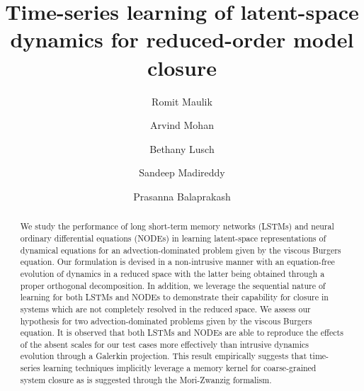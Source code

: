 \documentclass[preprint,12pt]{elsarticle}
\begin{document}
\begin{frontmatter}


\title{Time-series learning of latent-space dynamics for reduced-order model closure}

\author[label1]{Romit Maulik}
\author[label2]{Arvind Mohan}
\author[label1]{Bethany Lusch}
\author[label3]{Sandeep Madireddy}
\author[label1,label3]{Prasanna Balaprakash}

\address[label1]{Argonne Leadership Computing Facility, Argonne National Laboratory, Lemont, IL 60439, USA}
\address[label2]{Center for Nonlinear Studies/CCS-2 Division, Los Alamos National Laboratory, Los Alamos, NM 87545, USA}
\address[label3]{Mathematics and Computer Science Division, Argonne National Laboratory, Lemont, IL 60439, USA}




\begin{abstract}
We study the performance of long short-term memory networks (LSTMs) and neural ordinary differential equations (NODEs) in learning latent-space representations of dynamical equations for an advection-dominated problem given by the viscous Burgers equation. Our formulation is devised in a non-intrusive manner with an equation-free evolution of dynamics in a reduced space with the latter being obtained through a proper orthogonal decomposition. In addition, we leverage the sequential nature of learning for both LSTMs and NODEs to demonstrate their capability for closure in systems which are not completely resolved in the reduced space. We assess our hypothesis for two advection-dominated problems given by the viscous Burgers equation. It is observed that both LSTMs and NODEs are able to reproduce the effects of the absent scales for our test cases more effectively than intrusive dynamics evolution through a Galerkin projection. This result empirically suggests that time-series learning techniques implicitly leverage a memory kernel for coarse-grained system closure as is suggested through the Mori-Zwanzig formalism.
\end{abstract}


\end{frontmatter}
\end{document}
